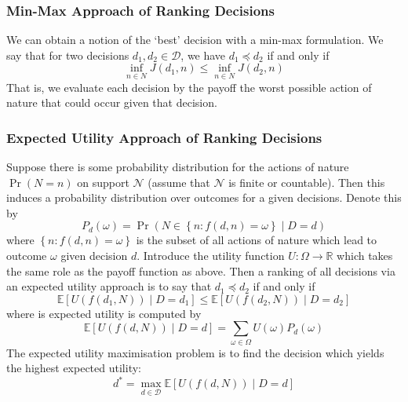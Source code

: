 \documentclass[11pt]{report} %
\begin{document}
\subsubsection{Min-Max Approach of Ranking Decisions}

We can obtain a notion of the `best' decision with a min-max formulation. We say that for two decisions $d_{1}, d_{2} \in \mathcal{D}$, we have $d_{1} \preceq d_{2}$ if and only if
\begin{equation}
\inf_{n\in N}J\left(d_{1}, n\right) \leq \inf_{n\in N}J\left(d_{2}, n\right)
\end{equation}
That is, we evaluate each decision by the payoff the worst possible action of nature that could occur given that decision.

\subsubsection{Expected Utility Approach of Ranking Decisions}

Suppose there is some probability distribution for the actions of nature $\operatorname{Pr}\left(N = n\right)$ on support $\mathcal{N}$ (assume that $\mathcal{N}$ is finite or countable). Then this induces a probability distribution over outcomes for a given decisions. Denote this by
\begin{equation}
P_{d}\left(\omega\right) = \operatorname{Pr}\left(N \in \left\{n: f\left(d, n\right) = \omega \right\} \middle| D = d\right)
\end{equation}
where $\left\{n: f\left(d, n\right) = \omega \right\}$ is the subset of all actions of nature which lead to outcome $\omega$ given decision $d$. Introduce the utility function $U: \Omega \to \mathbb{R}$ which takes the same role as the payoff function as above. Then a ranking of all decisions via an expected utility approach is to say that $d_{1} \preceq d_{2}$ if and only if
\begin{equation}
\mathbb{E}\left[U\left(f\left(d_{1}, N\right)\right) \middle| D = d_{1}\right] \leq \mathbb{E}\left[U\left(f\left(d_{2}, N\right)\right) \middle| D = d_{2}\right]
\end{equation}
where is expected utility is computed by
\begin{equation}
\mathbb{E}\left[U\left(f\left(d, N\right)\right) \middle| D = d\right]  = \sum_{\omega \in \Omega}U\left(\omega\right)P_{d}\left(\omega\right)
\end{equation}
The expected utility maximisation problem is to find the decision which yields the highest expected utility:
\begin{equation}
d^{*} = \max_{d \in \mathcal{D}}\mathbb{E}\left[U\left(f\left(d, N\right)\right) \middle| D = d\right]
\end{equation}
\end{document}
